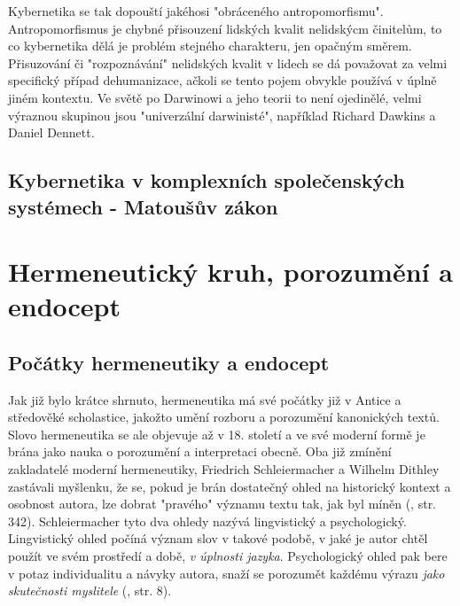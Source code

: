 \documentclass[11pt,a4paper]{article}
\begin{document}
Kybernetika se tak dopouští jakéhosi "obráceného antropomorfismu". Antropomorfismus je chybné přisouzení lidských kvalit nelidskýcm činitelům, to co kybernetika dělá je problém stejného charakteru, jen opačným směrem. Přisuzování či "rozpoznávání" nelidských kvalit v lidech se dá považovat za velmi specifický případ dehumanizace, ačkoli se tento pojem obvykle používá v úplně jiném kontextu. Ve světě po Darwinowi a jeho teorii to není ojedinělé, velmi výraznou skupinou jsou "univerzální darwinisté", například Richard Dawkins a Daniel Dennett. 


\subsection{Kybernetika v komplexních společenských systémech - Matoušův zákon}


\pagebreak

\section{Hermeneutický kruh, porozumění a endocept}

\subsection{Počátky hermeneutiky a endocept}

Jak již bylo krátce shrnuto, hermeneutika má své počátky již v Antice a středověké scholastice, jakožto umění rozboru a porozumění kanonických textů. Slovo hermeneutika se ale objevuje až v 18. století a ve své moderní formě je brána jako nauka o porozumění a interpretaci obecně. Oba již zmínění zakladatelé moderní hermeneutiky, Friedrich Schleiermacher a Wilhelm Dithley zastávali myšlenku, že se, pokud je brán dostatečný ohled na historický kontext a osobnost autora, lze dobrat "pravého" významu textu tak, jak byl míněn (\cite{stocker_palgrave_2018}, str. 342). Schleiermacher tyto dva ohledy nazývá lingvistický a psychologický. Lingvistický ohled počíná význam slov v takové podobě, v jaké je autor chtěl použít ve svém prostředí a době, \textit{v úplnosti jazyka}. Psychologický ohled pak bere v potaz individualitu a návyky autora, snaží se porozumět každému výrazu \textit{jako skutečnosti myslitele} (\cite{schleiermacher_hermeneutics_1998}, str. 8).
\end{document}
